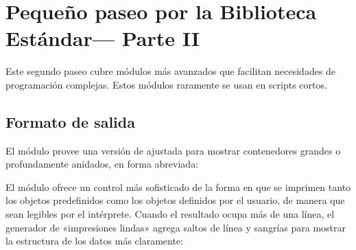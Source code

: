 \documentclass[a5paper,10pt,spanish]{sphinxmanual}
\begin{document}
\chapter{Pequeño paseo por la Biblioteca Estándar— Parte II}
\label{\detokenize{tutorial/stdlib2:brief-tour-of-the-standard-library-part-ii}}\label{\detokenize{tutorial/stdlib2:tut-brieftourtwo}}\label{\detokenize{tutorial/stdlib2::doc}}
\sphinxAtStartPar
Este segundo paseo cubre módulos más avanzados que facilitan necesidades de programación complejas.  Estos módulos raramente se usan en scripts cortos.


\section{Formato de salida}
\label{\detokenize{tutorial/stdlib2:output-formatting}}\label{\detokenize{tutorial/stdlib2:tut-output-formatting}}
\sphinxAtStartPar
El módulo  provee una versión de  ajustada para mostrar contenedores grandes o profundamente anidados, en forma abreviada:

\begin{sphinxVerbatim}[commandchars=\\\{\}]
 
\end{sphinxVerbatim}

\sphinxAtStartPar
El módulo  ofrece un control más sofisticado de la forma en que se imprimen tanto los objetos predefinidos como los objetos definidos por el usuario, de manera que sean legibles por el intérprete. Cuando el resultado ocupa más de una línea, el generador de «impresiones lindas» agrega saltos de línea y sangrías para mostrar la estructura de los datos más claramente:
\end{document}
